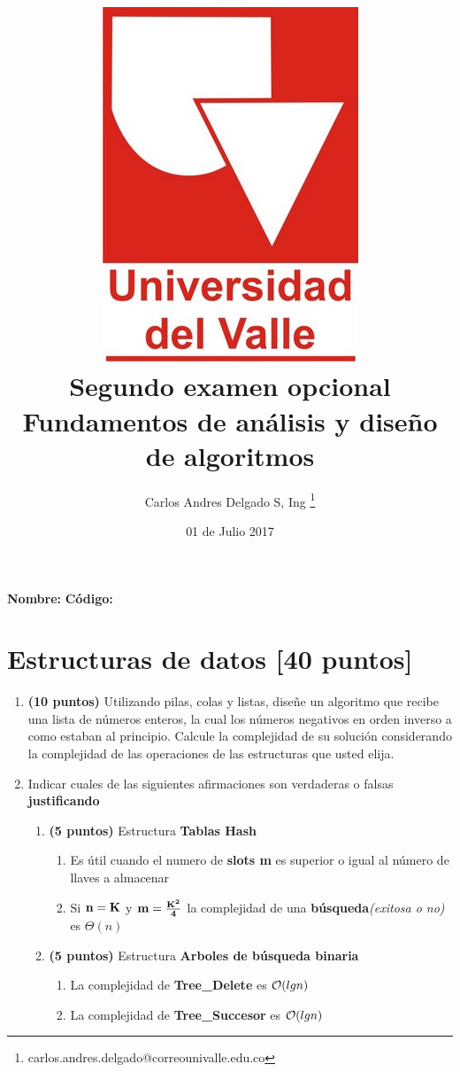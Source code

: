 \documentclass[10pt,twocolumn]{article}
\title{\vspace{-2.5cm} \includegraphics[scale=0.15]{univalle.jpg} \\Segundo examen opcional \\ Fundamentos de análisis y diseño de algoritmos \\ \vspace{-0.5cm}}
\author{Carlos Andres Delgado S, Ing \footnote{ carlos.andres.delgado@correounivalle.edu.co }}
\date{\vspace{-0.2cm}01 de Julio 2017}
\newcommand{\raya}{\underline{\hspace{3cm}}}
\begin{document}
\maketitle
\vspace{-0.5cm}
{\bf Nombre:\underline{\hspace{6cm}}}
\hfill
{\bf Código:\raya}

\section{Estructuras de datos \small{[40 puntos]}} 

\begin{enumerate}
	\item \textbf{(10 puntos)} Utilizando pilas, colas y listas, diseñe un algoritmo que recibe una lista de números enteros, la cual los números negativos en orden inverso a como estaban al principio. Calcule la complejidad de su solución considerando la complejidad de las operaciones de las estructuras que usted elija.


\item Indicar cuales de las siguientes afirmaciones son verdaderas o falsas \textbf{justificando}
\begin{enumerate}
\item \textbf{(5 puntos)}  Estructura \textbf{Tablas Hash}
  \begin{enumerate}
  \item Es \'util cuando el numero de \textbf{slots m} es superior o igual al n\'umero de llaves a almacenar
  \item Si ${\bf n=K}$ y ${\bf m=\frac{K^2}{4}}$ la complejidad de una {\bf búsqueda}{\it (exitosa o no)} es $\Theta(n)$
  \end{enumerate}
\item \textbf{(5 puntos)}  Estructura \textbf{Arboles de b\'usqueda binaria}
  \begin{enumerate}
  \item La complejidad de \textbf{Tree\_Delete} es ${\cal O} (lg n)$
  \item La complejidad de \textbf{Tree\_Succesor} es ${\cal O} (lg n)$
  \end{enumerate}


\end{enumerate}
\end{enumerate}
\end{document}
